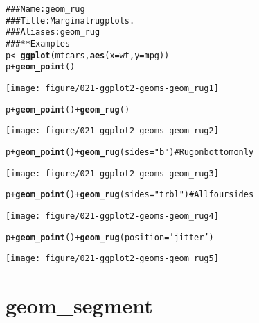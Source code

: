 \documentclass[a4paper,titlepage]{tufte-handout}\usepackage{graphicx, color}
\makeatletter
\def\maxwidth{ %
  \ifdim\Gin@nat@width>\linewidth
    \linewidth
  \else
    \Gin@nat@width
  \fi
}
\newcommand{\hlfunctioncall}[1]{\textcolor[rgb]{0.501960784313725,0,0.329411764705882}{\textbf{#1}}}%
\newcommand{\hlstring}[1]{\textcolor[rgb]{0.6,0.6,1}{#1}}%
\newcommand{\hlcomment}[1]{\textcolor[rgb]{0.180392156862745,0.6,0.341176470588235}{#1}}%
\newenvironment{kframe}{%
 \def\at@end@of@kframe{}%
 \ifinner\ifhmode%
  \def\at@end@of@kframe{\end{minipage}}%
  \begin{minipage}{\columnwidth}%
 \fi\fi%
 \def\FrameCommand##1{\hskip\@totalleftmargin \hskip-\fboxsep
 \colorbox{shadecolor}{##1}\hskip-\fboxsep
     \hskip-\linewidth \hskip-\@totalleftmargin \hskip\columnwidth}%
 \MakeFramed {\advance\hsize-\width
   \@totalleftmargin\z@ \linewidth\hsize
   \@setminipage}}%
 {\par\unskip\endMakeFramed%
 \at@end@of@kframe}
\newenvironment{knitrout}{}{} %
\makeatother
\begin{document}
\begin{knitrout}
\color{fgcolor}\begin{kframe}
\begin{alltt}
\hlcomment{### Name: geom_rug}
\hlcomment{### Title: Marginal rug plots.}
\hlcomment{### Aliases: geom_rug}
\hlcomment{### ** Examples}
p <- \hlfunctioncall{ggplot}(mtcars, \hlfunctioncall{aes}(x=wt, y=mpg))
p + \hlfunctioncall{geom_point}()
\end{alltt}
\end{kframe}\texttt{[image: figure/021-ggplot2-geoms-geom\_rug1]} \begin{kframe}\begin{alltt}
p + \hlfunctioncall{geom_point}() + \hlfunctioncall{geom_rug}()
\end{alltt}
\end{kframe}\texttt{[image: figure/021-ggplot2-geoms-geom\_rug2]} \begin{kframe}\begin{alltt}
p + \hlfunctioncall{geom_point}() + \hlfunctioncall{geom_rug}(sides=\hlstring{"b"})    # Rug on bottom only
\end{alltt}
\end{kframe}\texttt{[image: figure/021-ggplot2-geoms-geom\_rug3]} \begin{kframe}\begin{alltt}
p + \hlfunctioncall{geom_point}() + \hlfunctioncall{geom_rug}(sides=\hlstring{"trbl"}) # All four sides
\end{alltt}
\end{kframe}\texttt{[image: figure/021-ggplot2-geoms-geom\_rug4]} \begin{kframe}\begin{alltt}
p + \hlfunctioncall{geom_point}() + \hlfunctioncall{geom_rug}(position=\hlstring{'jitter'})
\end{alltt}
\end{kframe}\texttt{[image: figure/021-ggplot2-geoms-geom\_rug5]} 
\end{knitrout}


\section{geom\_segment}
\end{document}
